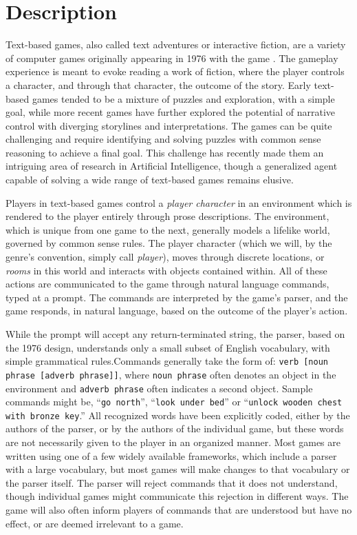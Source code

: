 \section{Description}

Text-based games, also called text adventures or interactive fiction,
are a variety of computer games originally appearing in 1976 with the
game \cite{noauthor_adventure_2010}. The gameplay
experience is meant to evoke reading a work of fiction, where the
player controls a character, and through that character, the outcome of
the story. Early text-based games tended to be a mixture of puzzles and
exploration, with a simple goal, while more recent games have further
explored the potential of narrative control with diverging storylines
and interpretations. The games can be quite challenging and require
identifying and solving puzzles with common sense reasoning to achieve a
final goal. This challenge has recently made them an intriguing area of
research in Artificial Intelligence, though a generalized agent capable
of solving a wide range of text-based games remains
elusive\cite{cote_textworld_2019}.

Players in text-based games control a \emph{player character} in an
environment which is rendered to the player entirely through prose
descriptions. The environment, which is unique from one game to the
next, generally models a lifelike world, governed by common sense rules.
The player character (which we will, by the genre's convention, simply
call \emph{player}), moves through discrete locations, or \emph{rooms}
in this world and interacts with objects contained within. All of these
actions are communicated to the game through natural language commands,
typed at a prompt. The commands are interpreted by the game's parser,
and the game responds, in natural language, based on the outcome of the
player's action.

While the prompt will accept any return-terminated string, the parser,
based on the 1976 design, understands only a small subset of English
vocabulary, with simple grammatical rules.\footnotemark Commands
generally take the form of: \texttt{verb [noun phrase [adverb phrase]]},
where \texttt{noun phrase} often denotes an object in the environment
and \texttt{adverb phrase} often indicates a second object. Sample
commands might be, ``\texttt{go north}'', ``\texttt{look under bed}''
or ``\texttt{unlock wooden chest with bronze
key}.''\cite{cote_textworld_2019} All recognized words have been
explicitly coded, either by the authors of the parser, or by the authors
of the individual game, but these words are not necessarily given to the
player in an organized manner. Most games are written using one of a few
widely available frameworks, which include a parser with a large
vocabulary, but most games will make changes to that vocabulary or the
parser itself. The parser will reject commands that it does not
understand, though individual games might communicate this rejection in
different ways. The game will also often inform players of commands that
are understood but have no effect, or are deemed irrelevant to a game.

